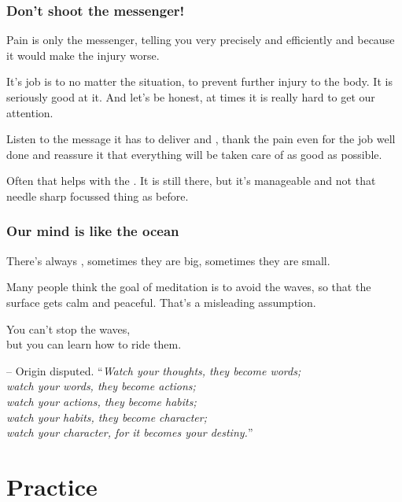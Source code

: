 \begin{frame}
\frametitle{Don't shoot the messenger!}
Pain is only the messenger, telling you very precisely and efficiently  and  because it would make the injury worse.

It's job is to  no matter the situation, to prevent further injury to the body. It is seriously good at it. And let's be honest, at times it is really hard to get our attention.

Listen to the message it has to deliver and , thank the pain even for the job well done and reassure it that everything will be taken care of as good as possible. 

Often that helps with the . It is still there, but it's manageable and not that needle sharp focussed thing as before.
\end{frame}

\begin{frame}
\frametitle{Our mind is like the ocean}
There's always , sometimes they are big, sometimes they are small. 

Many people think the goal of meditation is to avoid the waves, so that the surface gets calm and peaceful. That's a misleading assumption.

\begin{center}
You can't stop the waves, \\
but you can learn how to ride them.
\end{center}

\begin{block}{-- Origin disputed.}
``\textit{Watch your thoughts, they become words;\\
watch your words, they become actions;\\
watch your actions, they become habits;\\
watch your habits, they become character;\\
watch your character, for it becomes your destiny.}''
\end{block}
\end{frame}
\section{Practice}

